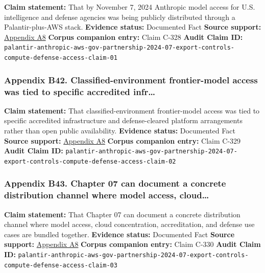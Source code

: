 \documentclass[
  american,
  11pt,
  letterpaper,
]{article}
\begin{document}
\textbf{Claim statement:} That by November 7, 2024 Anthropic model
access for U.S. intelligence and defense agencies was being publicly
distributed through a Palantir-plus-AWS stack. \textbf{Evidence status:}
Documented Fact \textbf{Source support:}
\hyperref[ch-07-appendix-a8-anthropic-and-palantir-partner-to-bring-claude-ai-models-to-aws-for-u-s-government-intelligence-and-defense-operations]{Appendix
A8} \textbf{Corpus companion entry:} Claim C-328 \textbf{Audit Claim
ID:}
\texttt{palantir-anthropic-aws-gov-partnership-2024-07-export-controls-compute-defense-access-claim-01}

\subsubsection{Appendix B42. Classified-environment frontier-model
access was tied to specific accredited
infr\ldots{}}\label{ch-07-appendix-b42-classified-environment-frontier-model-access-was-tied-to-specific-accredited-infr}

\textbf{Claim statement:} That classified-environment frontier-model
access was tied to specific accredited infrastructure and
defense-cleared platform arrangements rather than open public
availability. \textbf{Evidence status:} Documented Fact \textbf{Source
support:}
\hyperref[ch-07-appendix-a8-anthropic-and-palantir-partner-to-bring-claude-ai-models-to-aws-for-u-s-government-intelligence-and-defense-operations]{Appendix
A8} \textbf{Corpus companion entry:} Claim C-329 \textbf{Audit Claim
ID:}
\texttt{palantir-anthropic-aws-gov-partnership-2024-07-export-controls-compute-defense-access-claim-02}

\subsubsection{Appendix B43. Chapter 07 can document a concrete
distribution channel where model access,
cloud\ldots{}}\label{ch-07-appendix-b43-chapter-07-can-document-a-concrete-distribution-channel-where-model-access-cloud}

\textbf{Claim statement:} That Chapter 07 can document a concrete
distribution channel where model access, cloud concentration,
accreditation, and defense use cases are bundled together.
\textbf{Evidence status:} Documented Fact \textbf{Source support:}
\hyperref[ch-07-appendix-a8-anthropic-and-palantir-partner-to-bring-claude-ai-models-to-aws-for-u-s-government-intelligence-and-defense-operations]{Appendix
A8} \textbf{Corpus companion entry:} Claim C-330 \textbf{Audit Claim
ID:}
\texttt{palantir-anthropic-aws-gov-partnership-2024-07-export-controls-compute-defense-access-claim-03}
\end{document}
